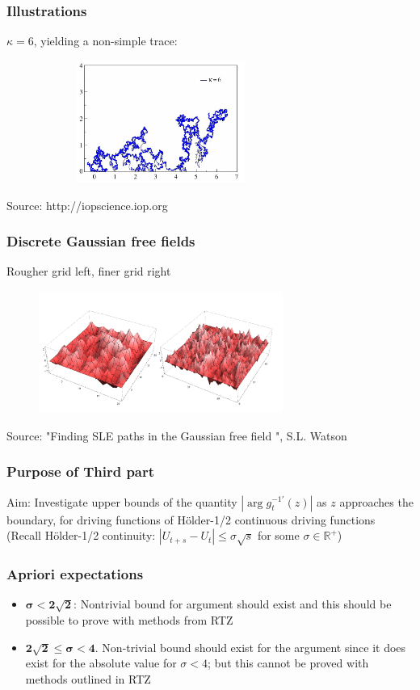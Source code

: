 \documentclass[10pt, compress]{beamer}
\begin{document}
\begin{frame}[fragile]
  \frametitle{Illustrations}
$\kappa=6$, yielding a non-simple trace:
\begin{figure}
  \centering
 \includegraphics[width=8cm,height=4cm]{nonsimple.png}
\end{figure}
\small
Source: http://iopscience.iop.org
\normalsize
\end{frame}

\begin{frame}[fragile]
  \frametitle{Discrete Gaussian free fields}
Rougher grid left, finer grid right
\begin{figure}
  \centering
 \includegraphics[width=8cm,height=4cm]{gaussian.png}
\end{figure}
\small
Source: "Finding SLE paths in the Gaussian free field ", S.L. Watson
\normalsize
\end{frame}

\begin{frame}[fragile]
  \frametitle{Purpose of Third part}
Aim: Investigate upper bounds of the quantity $|\arg g^{-1 \prime}_{t}(z)|$ as $z$ approaches the boundary, for driving functions of H\"older-1/2 continuous driving functions\\

(Recall H\"older-1/2 continuity: $|U_{t+s}-U_{t}| \leq \sigma \sqrt{s}$ for some $\sigma \in \mathbb{R}^{+}$)


\end{frame}

\begin{frame}[fragile]
  \frametitle{Apriori expectations}
\begin{itemize}
\item $\boldsymbol{\sigma<2\sqrt{2}}$: Nontrivial bound for argument should exist and this should be possible to prove with methods from RTZ\\

\item $\boldsymbol{2\sqrt{2} \leq \sigma < 4}$. Non-trivial bound should exist for the argument since it does exist for the absolute value for $\sigma <4$; but this cannot be proved with methods outlined in RTZ
\end{itemize}
\end{frame}
\end{document}
